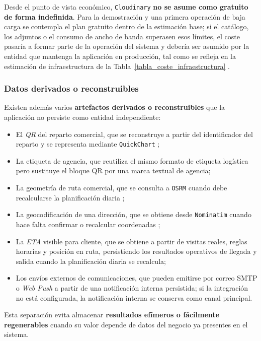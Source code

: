Desde el punto de vista económico, \texttt{Cloudinary} \textbf{no se asume como gratuito de forma indefinida}. Para la demostración y una primera operación de baja carga se contempla el plan gratuito dentro de la estimación base; si el catálogo, los adjuntos o el consumo de ancho de banda superasen esos límites, el coste pasaría a formar parte de la operación del sistema y debería ser asumido por la entidad que mantenga la aplicación en producción, tal como se refleja en la estimación de infraestructura de la Tabla~\ref{tabla_coste_infraestructura} \citep{cloudinarypricing2026}.

\subsubsection*{Datos derivados o reconstruibles}

Existen además varios \textbf{artefactos derivados o reconstruibles} que la aplicación no persiste como entidad independiente:

\begin{itemize}
    \item El \textit{QR} del reparto comercial, que se reconstruye a partir del identificador del reparto y se representa mediante \texttt{QuickChart} \citep{quickchartqr2026};
    \item La etiqueta de agencia, que reutiliza el mismo formato de etiqueta logística pero sustituye el bloque QR por una marca textual de agencia;
    \item La geometría de ruta comercial, que se consulta a \texttt{OSRM} cuando debe recalcularse la planificación diaria \citep{osrmdocs2026};
    \item La geocodificación de una dirección, que se obtiene desde \texttt{Nominatim} cuando hace falta confirmar o recalcular coordenadas \citep{nominatimapi2026};
    \item La \textit{ETA} visible para cliente, que se obtiene a partir de visitas reales, reglas horarias y posición en ruta, persistiendo los resultados operativos de llegada y salida cuando la planificación diaria se recalcula;
    \item Los envíos externos de comunicaciones, que pueden emitirse por correo SMTP o \textit{Web Push} a partir de una notificación interna persistida; si la integración no está configurada, la notificación interna se conserva como canal principal.
\end{itemize}

Esta separación evita almacenar \textbf{resultados efímeros o fácilmente regenerables} cuando su valor depende de datos del negocio ya presentes en el sistema.

